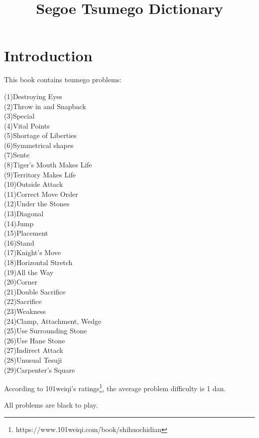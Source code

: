 \title{Segoe Tsumego Dictionary}

\chapter*{Introduction}%
\thispagestyle{empty}%
This book contains \countproblems{} tsumego problems:

(1)\:\:Destroying Eyes\\
(2)\:\:Throw in and Snapback\\
(3)\:\:Special\\
(4)\:\:Vital Points\\
(5)\:\:Shortage of Liberties\\
(6)\:\:Symmetrical shapes\\
(7)\:\:Sente\\
(8)\:\:Tiger's Mouth Makes Life\\
(9)\:\:Territory Makes Life\\
(10)\:\:Outside Attack\\
(11)\:\:Correct Move Order\\
(12)\:\:Under the Stones\\
(13)\:\:Diagonal\\
(14)\:\:Jump\\
(15)\:\:Placement\\
(16)\:\:Stand\\
(17)\:\:Knight's Move\\
(18)\:\:Horizontal Stretch\\
(19)\:\:All the Way\\
(20)\:\:Corner\\
(21)\:\:Double Sacrifice\\
(22)\:\:Sacrifice\\
(23)\:\:Weakness\\
(24)\:\:Clamp, Attachment, Wedge\\
(25)\:\:Use Surrounding Stone\\
(26)\:\:Use Hane Stone\\
(27)\:\:Indirect Attack\\
(28)\:\:Unusual Tesuji\\
(29)\:\:Carpenter's Square

According to 101weiqi's ratings\footnote{https://www.101weiqi.com/book/shihuochidian}, the average problem difficulty is 1 dan.

All problems are black to play.

\renderproblems
\rendersolutions


